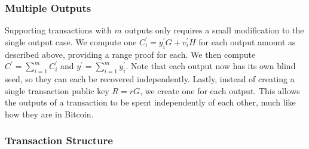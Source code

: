 \documentclass{article}
\newcommand{\oy}{\ensuremath{y^\prime}}
\newcommand{\oiy}{\ensuremath{y^\prime_i}}
\newcommand{\oC}{\ensuremath{C^\prime}}
\newcommand{\oiC}{\ensuremath{C^\prime_i}}
\newcommand{\oiv}{\ensuremath{v^\prime_i}}
\begin{document}
\subsubsection{Multiple Outputs}

Supporting transactions with $m$ outputs only requires a small modification to
the single output case.  We compute one $\oiC = \oiy G + \oiv H$ for each output
amount as described above, providing a range proof for each.  We then compute
$\oC = \sum_{i=1}^m \oiC$ and $\oy = \sum_{i=1}^m \oiy$.  Note that each output
now has its own blind seed, so they can each be recovered independently.
Lastly, instead of creating a single transaction public key $R=rG$, we create
one for each output.  This allows the outputs of a transaction to be spent
independently of each other, much like how they are in Bitcoin.

\subsubsection{Transaction Structure}
\end{document}
